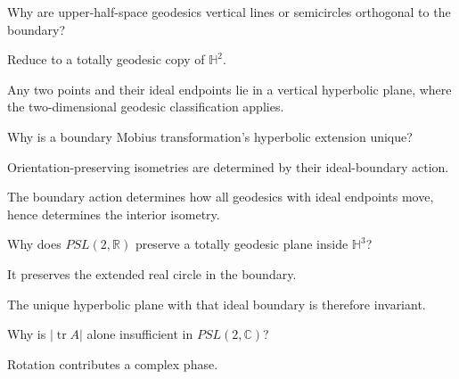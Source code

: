 \begin{exercise}\label{exr:vii36-ped-06}
Why are upper-half-space geodesics vertical lines or semicircles orthogonal to the boundary?
\end{exercise}

\begin{hint}
Reduce to a totally geodesic copy of \(\mathbb H^2\).
\end{hint}

\begin{solution}
Any two points and their ideal endpoints lie in a vertical hyperbolic plane, where the two-dimensional geodesic classification applies.
\end{solution}

\begin{exercise}\label{exr:vii36-ped-07}
Why is a boundary Mobius transformation's hyperbolic extension unique?
\end{exercise}

\begin{hint}
Orientation-preserving isometries are determined by their ideal-boundary action.
\end{hint}

\begin{solution}
The boundary action determines how all geodesics with ideal endpoints move, hence determines the interior isometry.
\end{solution}

\begin{exercise}\label{exr:vii36-ped-08}
Why does \(PSL(2,\mathbb R)\) preserve a totally geodesic plane inside \(\mathbb H^3\)?
\end{exercise}

\begin{hint}
It preserves the extended real circle in the boundary.
\end{hint}

\begin{solution}
The unique hyperbolic plane with that ideal boundary is therefore invariant.
\end{solution}

\begin{exercise}\label{exr:vii36-ped-09}
Why is \(|\operatorname{tr}A|\) alone insufficient in \(PSL(2,\mathbb C)\)?
\end{exercise}

\begin{hint}
Rotation contributes a complex phase.
\end{hint}

